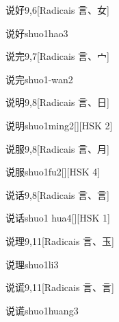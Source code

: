 \begin{entry}{说好}{9,6}[Radicais ⾔、⼥]
  \begin{phonetics}{说好}{shuo1hao3}
  \end{phonetics}
\end{entry}

\begin{entry}{说完}{9,7}[Radicais ⾔、⼧]
  \begin{phonetics}{说完}{shuo1-wan2}
  \end{phonetics}
\end{entry}

\begin{entry}{说明}{9,8}[Radicais ⾔、⽇]
  \begin{phonetics}{说明}{shuo1ming2}[][HSK 2]
  \end{phonetics}
\end{entry}

\begin{entry}{说服}{9,8}[Radicais ⾔、⽉]
  \begin{phonetics}{说服}{shuo1fu2}[][HSK 4]
  \end{phonetics}
\end{entry}

\begin{entry}{说话}{9,8}[Radicais ⾔、⾔]
  \begin{phonetics}{说话}{shuo1 hua4}[][HSK 1]
  \end{phonetics}
\end{entry}

\begin{entry}{说理}{9,11}[Radicais ⾔、⽟]
  \begin{phonetics}{说理}{shuo1li3}
  \end{phonetics}
\end{entry}

\begin{entry}{说谎}{9,11}[Radicais ⾔、⾔]
  \begin{phonetics}{说谎}{shuo1huang3}
  \end{phonetics}
\end{entry}

